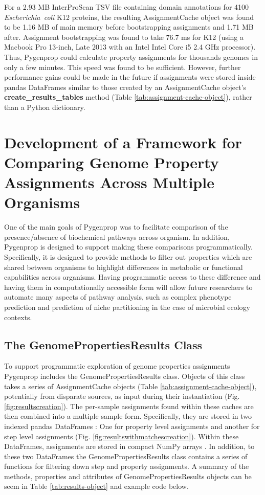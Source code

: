 For a 2.93 MB InterProScan TSV file containing domain annotations for 4100 \textit{Escherichia\ coli }K12 proteins, the resulting AssignmentCache object was found to be 1.16 MB of main memory before bootstrapping assignments and 1.71 MB after. Assignment bootstrapping was found to take 76.7  ms for K12 (using a Macbook Pro 13-inch, Late 2013 with an Intel Intel Core i5 2.4 GHz processor). Thus, Pygenprop could calculate property assignments for thousands genomes in only a few minutes. This speed was found to be sufficient. However, further performance gains could be made in the future if assignments were stored inside pandas DataFrames \cite{mckinney2010data} similar to those created by an AssignmentCache object's \textbf{create\_results\_tables} method (Table \ref{tab:assignment-cache-object}), rather than a Python dictionary.

\section{Development of a Framework for Comparing Genome Property Assignments Across Multiple Organisms}

One of the main goals of Pygenprop was to facilitate comparison of the presence/absence of biochemical pathways across organism. In addition, Pygenprop is designed to support making these comparisons programmatically. Specifically, it is designed to provide methods to filter out properties which are shared between organisms to highlight differences in metabolic or functional capabilities across organisms. Having programmatic access to these difference and having them in computationally accessible form will allow future researchers to automate many aspects of pathway analysis, such as complex phenotype prediction and prediction of niche partitioning in the case of microbial ecology contexts.

\subsection{The GenomePropertiesResults Class}

To support programmatic exploration of genome properties assignments Pygenprop includes the GenomePropertiesResults class. Objects of this class takes a series of AssignmentCache objects (Table \ref{tab:assignment-cache-object}), potentially from disparate sources, as input during their instantiation (Fig. \ref{fig:resultscreation}). The per-sample assignments found within these caches are then combined into a multiple sample form. Specifically, they are stored in two indexed pandas DataFrames \cite{mckinney2010data}: One for property level assignments and another for step level assignments (Fig. \ref{fig:resultswithmatchescreation}). Within these DataFrames, assignments are stored in compact NumPy arrays \cite{van2011numpy}. In addition, to these two DataFrames the GenomePropertiesResults class contains a series of functions for filtering down step and property assignments. A summary of the methods, properties and attributes of GenomePropertiesResults objects can be seem in Table \ref{tab:results-object} and example code below.

